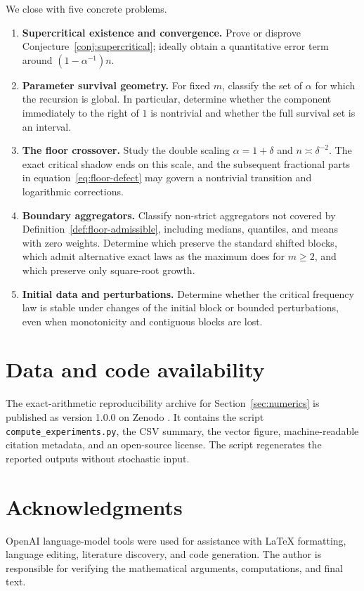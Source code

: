 \documentclass[11pt]{article}
\theoremstyle{definition}
\theoremstyle{remark}
\begin{document}
We close with five concrete problems.
\begin{enumerate}[leftmargin=2.1em]
\item \textbf{Supercritical existence and convergence.}
Prove or disprove Conjecture~\ref{conj:supercritical}; ideally obtain a
quantitative error term around $(1-\alpha^{-1})n$.

\item \textbf{Parameter survival geometry.}
For fixed $m$, classify the set of $\alpha$ for which the recursion is
global.  In particular, determine whether the component immediately to the
right of $1$ is nontrivial and whether the full survival set is an interval.

\item \textbf{The floor crossover.}
Study the double scaling $\alpha=1+\delta$ and
$n\asymp\delta^{-2}$.  The exact critical shadow ends on this scale, and the
subsequent fractional parts in equation~\eqref{eq:floor-defect} may govern a
nontrivial transition and logarithmic corrections.

\item \textbf{Boundary aggregators.}
Classify non-strict aggregators not covered by
Definition~\ref{def:floor-admissible}, including medians, quantiles, and means
with zero weights.  Determine which preserve the standard shifted blocks,
which admit alternative exact laws as the maximum does for $m\ge2$, and which
preserve only square-root growth.

\item \textbf{Initial data and perturbations.}
Determine whether the critical frequency law is stable under changes of the
initial block or bounded perturbations, even when monotonicity and contiguous
blocks are lost.
\end{enumerate}

\section*{Data and code availability}

The exact-arithmetic reproducibility archive for
Section~\ref{sec:numerics} is published as version 1.0.0 on Zenodo
\cite{mantovanelli-code}.  It contains the script
\nolinkurl{compute_experiments.py}, the CSV summary, the vector figure,
machine-readable citation metadata, and an open-source license.  The script
regenerates the reported outputs without stochastic input.

\section*{Acknowledgments}

OpenAI language-model tools were used for assistance with LaTeX formatting,
language editing, literature discovery, and code generation.  The author is
responsible for verifying the mathematical arguments, computations, and
final text.

\begingroup
\footnotesize
\setlength{\bibsep}{1pt plus 0.2pt}


\endgroup
\end{document}
